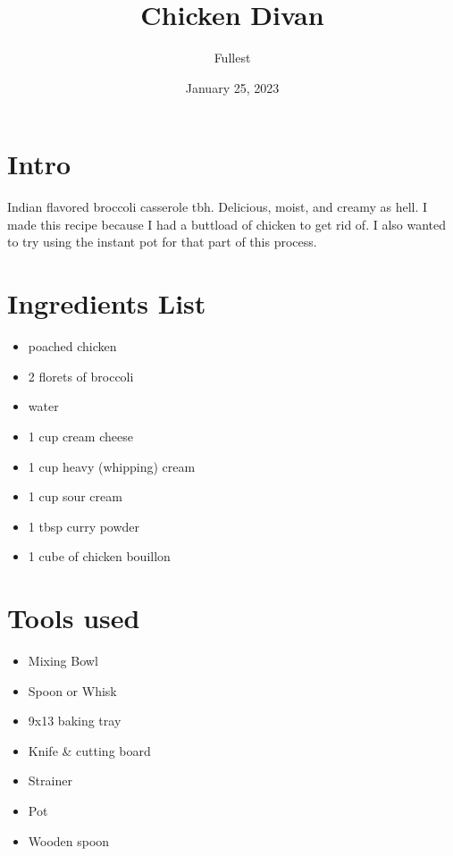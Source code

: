 \documentclass{article}
\title{\textbf{Chicken Divan}}
\author{Fullest}
\date{January 25, 2023}
\begin{document}
\maketitle
\thispagestyle{empty}

\begin{multicols}{2}

\section{Intro}
Indian flavored broccoli casserole tbh. Delicious, moist, and creamy as hell.\cite{WEBSITEWITHRECIPE:1} I made this recipe because I had a buttload of chicken to get rid of. I also wanted to try using the instant pot for that part of this process.\cite{CHICKEN}

\section{Ingredients List}
\begin{itemize}
	\item poached chicken\cite{CHICKEN}
	\item 2 florets of broccoli
	\item water
	\item 1 cup cream cheese
	\item 1 cup heavy (whipping) cream
	\item 1 cup sour cream
	\item 1 tbsp curry powder\cite{CURRYPOWDER}
	\item 1 cube of chicken bouillon
\end{itemize}

\section{Tools used}
\begin{itemize}
	\item Mixing Bowl
	\item Spoon or Whisk
	\item 9x13 baking tray
	\item Knife \& cutting board
	\item Strainer
	\item Pot
	\item Wooden spoon
\end{itemize}


\end{multicols}
\end{document}
